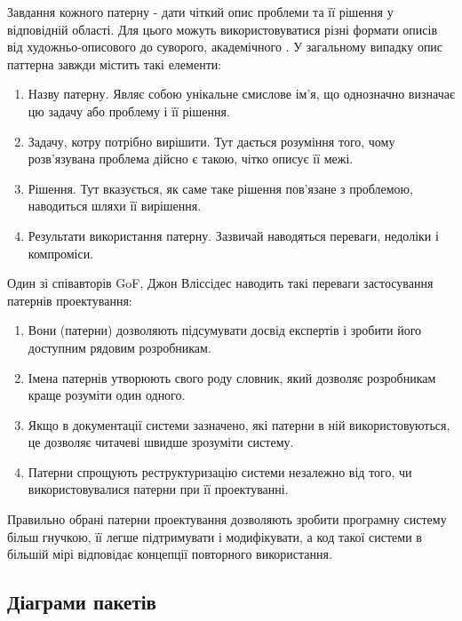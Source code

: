 \documentclass[../main.tex]{subfiles}
\begin{document}
Завдання кожного патерну - дати чіткий опис проблеми та її рішення у відповідній області. Для цього можуть використовуватися різні формати описів від художньо-описового \cite{pattern_language} до суворого, академічного \cite{gof}. У загальному випадку опис паттерна завжди містить такі елементи:

\begin{enumerate}
	\item Назву патерну. Являє собою унікальне смислове ім'я, що однозначно визначає цю задачу або проблему і її рішення.
	\item Задачу, котру потрібно вирішити. Тут дається розуміння того, чому розв'язувана проблема дійсно є такою, чітко описує її межі.
	\item Рішення. Тут вказується, як саме таке рішення пов'язане з проблемою, наводиться шляхи її вирішення.
	\item Результати використання патерну. Зазвичай наводяться переваги, недоліки і компроміси.
\end{enumerate}

Один зі співавторів GoF, Джон Вліссідес \cite{patterns_application} наводить такі переваги застосування патернів проектування:

\begin{enumerate}
	\item Вони (патерни) дозволяють підсумувати досвід експертів і зробити його доступним рядовим розробникам.
	\item Імена патернів утворюють свого роду словник, який дозволяє розробникам краще розуміти один одного.
	\item Якщо в документації системи зазначено, які патерни в ній використовуються, це дозволяє читачеві швидше зрозуміти систему.
	\item Патерни спрощують реструктуризацію системи незалежно від того, чи використовувалися патерни при її проектуванні.
\end{enumerate}

Правильно обрані патерни проектування дозволяють зробити програмну систему більш гнучкою, її легше підтримувати і модифікувати, а код такої системи в більшій мірі відповідає концепції повторного використання.

\subsection{Діаграми пакетів}
\end{document}
